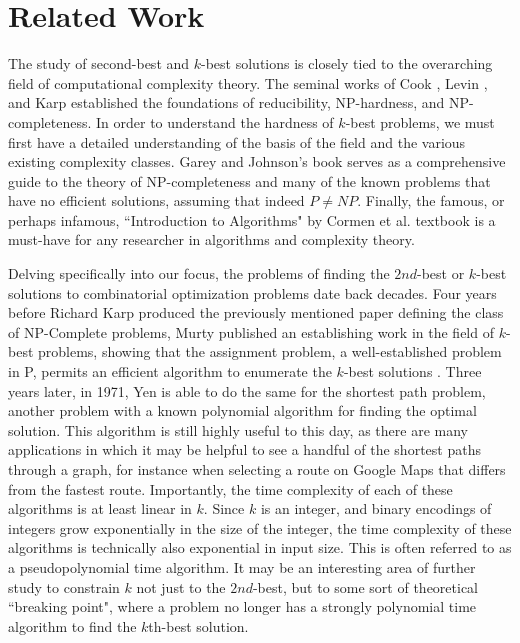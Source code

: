 \section{Related Work}
The study of second-best and $k$-best solutions is closely tied to the overarching field of computational complexity theory. The seminal works of Cook \cite{cook1971complexity}, Levin \cite{levin1973universal}, and Karp \cite{karp1972reducibility} established the foundations of reducibility, NP-hardness, and NP-completeness. In order to understand the hardness of $k$-best problems, we must first have a detailed understanding of the basis of the field and the various existing complexity classes. Garey and Johnson's book \cite{garey1979computers} serves as a comprehensive guide to the theory of NP-completeness and many of the known problems that have no efficient solutions, assuming that indeed $P \neq NP$. Finally, the famous, or perhaps infamous, ``Introduction to Algorithms" by Cormen et al. \cite{CLRS} textbook is a must-have for any researcher in algorithms and complexity theory.

Delving specifically into our focus, the problems of finding the $2nd$-best or $k$-best solutions to combinatorial optimization problems date back decades. Four years before Richard Karp produced the previously mentioned paper defining the class of NP-Complete problems, Murty published an establishing work in the field of $k$-best problems, showing that the assignment problem, a well-established problem in P, permits an efficient algorithm to enumerate the $k$-best solutions \cite{murty1968letter}. Three years later, in 1971, Yen is able to do the same for the shortest path problem, another problem with a known polynomial algorithm for finding the optimal solution. This algorithm is still highly useful to this day, as there are many applications in which it may be helpful to see a handful of the shortest paths through a graph, for instance when selecting a route on Google Maps that differs from the fastest route. Importantly, the time complexity of each of these algorithms is at least linear in $k$. Since $k$ is an integer, and binary encodings of integers grow exponentially in the size of the integer, the time complexity of these algorithms is technically also exponential in input size. This is often referred to as a pseudopolynomial time algorithm. It may be an interesting area of further study to constrain $k$ not just to the $2nd$-best, but to some sort of theoretical ``breaking point", where a problem no longer has a strongly polynomial time algorithm to find the $k$th-best solution.


